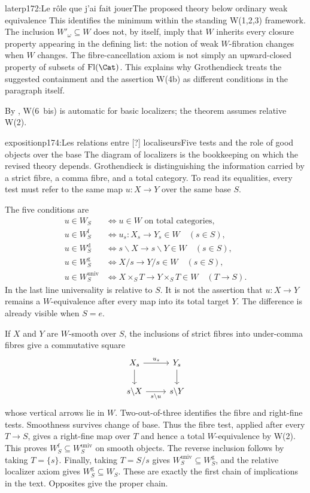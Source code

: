 \begin{dcomment}{later}{p172:Le rôle que j'ai fait jouer}{The proposed theory below ordinary weak equivalence}
This identifies the minimum within the standing W(1,2,3) framework. The inclusion $W'_\omega\subseteq W$ does not, by itself, imply that $W$ inherits every closure property appearing in the defining list: the notion of weak $W$-fibration changes when $W$ changes. The fibre-cancellation axiom is not simply an upward-closed property of subsets of $\mathrm{Fl}(\Cat)$. This explains why Grothendieck treats the suggested containment and the assertion W(4b) as different conditions in the paragraph itself.

By \citet[Corollary~4.2.22]{Cisinski2006}, W(6~bis) is automatic for basic localizers; the theorem assumes relative W(2).
\end{dcomment}

\begin{dcomment}{exposition}{p174:Les relations entre [?] localiseurs}{Five tests and the role of good objects over the base}
The diagram of localizers is the bookkeeping on which the revised theory depends. Grothendieck is distinguishing the information carried by a strict fibre, a comma fibre, and a total category. To read its equalities, every test must refer to the same map $u:X\to Y$ over the same base $S$.

The five conditions are
\[
\begin{aligned}
 u\in W_S&\iff u\in W\text{ on total categories},\\
 u\in W_S^{\mathrm f}&\iff u_s:X_s\to Y_s\in W\quad(s\in S),\\
 u\in W_S^{\mathrm d}&\iff s\backslash X\to s\backslash Y\in W\quad(s\in S),\\
 u\in W_S^{\mathrm g}&\iff X/s\to Y/s\in W\quad(s\in S),\\
 u\in W_S^{\mathrm{univ}}&\iff
 X\times_ST\to Y\times_ST\in W\quad(T\to S).
\end{aligned}
\]
In the last line universality is relative to $S$. It is not the assertion that $u:X\to Y$ remains a $W$-equivalence after every map into its total target $Y$. The difference is already visible when $S=e$.

If $X$ and $Y$ are $W$-smooth over $S$, the inclusions of strict fibres into under-comma fibres give a commutative square
\[
\begin{tikzcd}
 X_s\arrow[r,"u_s"]\arrow[d]&Y_s\arrow[d]\\
 s\backslash X\arrow[r,"s\backslash u"']&s\backslash Y
\end{tikzcd}
\]
whose vertical arrows lie in $W$. Two-out-of-three identifies the fibre and right-fine tests. Smoothness survives change of base. Thus the fibre test, applied after every $T\to S$, gives a right-fine map over $T$ and hence a total $W$-equivalence by W(2). This proves $W_S^{\mathrm f}\subseteq W_S^{\mathrm{univ}}$ on smooth objects. The reverse inclusion follows by taking $T=\{s\}$. Finally, taking $T=S/s$ gives $W_S^{\mathrm{univ}}\subseteq W_S^{\mathrm g}$, and the relative localizer axiom gives $W_S^{\mathrm g}\subseteq W_S$. These are exactly the first chain of implications in the text. Opposites give the proper chain.


\end{dcomment}
